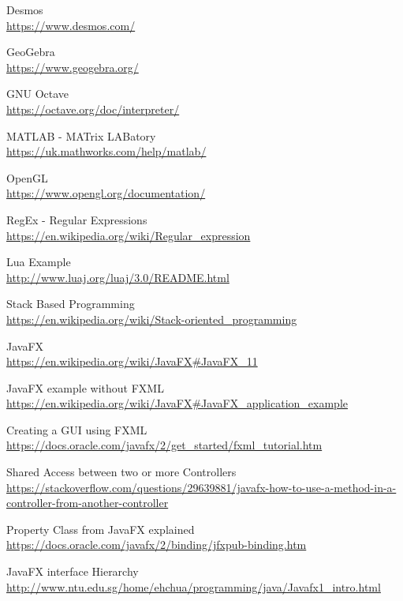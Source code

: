 \documentclass[../../main.tex]{subfiles}
\begin{document}
\begin{thebibliography}{9}

Desmos\\
\url{https://www.desmos.com/}

GeoGebra\\
\url{https://www.geogebra.org/}

GNU Octave\\
\url{https://octave.org/doc/interpreter/}

MATLAB - MATrix LABatory\\
\url{https://uk.mathworks.com/help/matlab/}

OpenGL\\
\url{https://www.opengl.org/documentation/}

RegEx - Regular Expressions\\
\url{https://en.wikipedia.org/wiki/Regular_expression}

Lua Example\\
\url{http://www.luaj.org/luaj/3.0/README.html}

Stack Based Programming\\
\url{https://en.wikipedia.org/wiki/Stack-oriented_programming}

JavaFX\\
\url{https://en.wikipedia.org/wiki/JavaFX#JavaFX_11}

JavaFX example without FXML\\
\url{https://en.wikipedia.org/wiki/JavaFX#JavaFX_application_example}

Creating a GUI using FXML\\
\url{https://docs.oracle.com/javafx/2/get_started/fxml_tutorial.htm}

Shared Access between two or more Controllers\\
\url{https://stackoverflow.com/questions/29639881/javafx-how-to-use-a-method-in-a-controller-from-another-controller}

Property Class from JavaFX explained\\
\url{https://docs.oracle.com/javafx/2/binding/jfxpub-binding.htm}

JavaFX interface Hierarchy\\
\url{http://www.ntu.edu.sg/home/ehchua/programming/java/Javafx1_intro.html}


\end{thebibliography}
\end{document}
